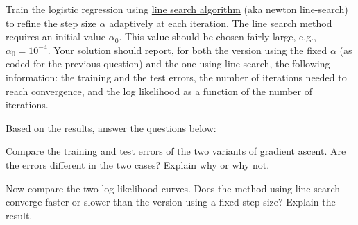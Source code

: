 \documentclass[12pt]{article}
\newenvironment{problem}[2][Problem:]{\begin{trivlist}
\item[\hskip \labelsep {\bfseries #1}\hskip \labelsep {\bfseries #2.}]}{\end{trivlist}}
\begin{document}
\begin{problem}{Programming: Line search optimization [8 points]}
Train the logistic regression using \href{https://en.wikipedia.org/wiki/Line_search}{line search algorithm} (aka newton line-search) to refine the step size $\alpha$ adaptively at each iteration. The line search method requires an initial value $\alpha_0$. This value should be chosen fairly large, e.g., $\alpha_0 = 10^{-4}$. Your solution should report, for both the version using the fixed $\alpha$ (as coded for the previous question) and the one using line search, the following information: the training and the test errors, the number of iterations needed to reach convergence, and the log likelihood as a function of the number of iterations. 
\end{problem}

Based on the results, answer the questions below:

\begin{problem}{Writing [2 points]}
Compare the training and test errors of the two variants of gradient ascent. Are the errors different in the two cases? Explain why or why not.
\end{problem}

\begin{problem}{Writing [2 points]}
Now compare the two log likelihood curves. Does the method using line search converge faster or slower than the version using a fixed step size? Explain the result.
\end{problem}


\pagebreak
\end{document}

